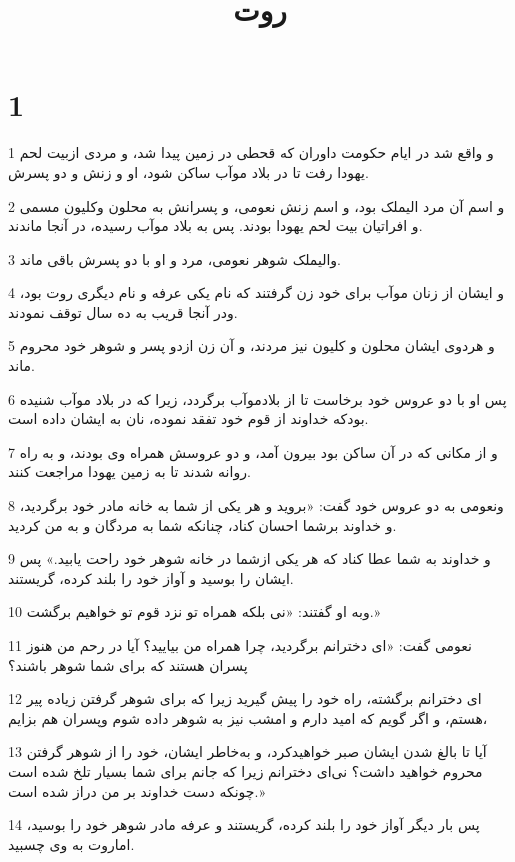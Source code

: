 

\title{روت}

 
\chapter{1}

\par 1 و واقع شد در ایام حکومت داوران که قحطی در زمین پیدا شد، و مردی ازبیت لحم یهودا رفت تا در بلاد موآب ساکن شود، او و زنش و دو پسرش.
\par 2 و اسم آن مرد الیملک بود، و اسم زنش نعومی، و پسرانش به محلون وکلیون مسمی و افراتیان بیت لحم یهودا بودند. پس به بلاد موآب رسیده، در آنجا ماندند.
\par 3 والیملک شوهر نعومی، مرد و او با دو پسرش باقی ماند.
\par 4 و ایشان از زنان موآب برای خود زن گرفتند که نام یکی عرفه و نام دیگری روت بود، ودر آنجا قریب به ده سال توقف نمودند.
\par 5 و هردوی ایشان محلون و کلیون نیز مردند، و آن زن ازدو پسر و شوهر خود محروم ماند.
\par 6 پس او با دو عروس خود برخاست تا از بلادموآب برگردد، زیرا که در بلاد موآب شنیده بودکه خداوند از قوم خود تفقد نموده، نان به ایشان داده است.
\par 7 و از مکانی که در آن ساکن بود بیرون آمد، و دو عروسش همراه وی بودند، و به راه روانه شدند تا به زمین یهودا مراجعت کنند.
\par 8 ونعومی به دو عروس خود گفت: «بروید و هر یکی از شما به خانه مادر خود برگردید، و خداوند برشما احسان کناد، چنانکه شما به مردگان و به من کردید.
\par 9 و خداوند به شما عطا کناد که هر یکی ازشما در خانه شوهر خود راحت یابید.» پس ایشان را بوسید و آواز خود را بلند کرده، گریستند.
\par 10 وبه او گفتند: «نی بلکه همراه تو نزد قوم تو خواهیم برگشت.»
\par 11 نعومی گفت: «ای دخترانم برگردید، چرا همراه من بیایید؟ آیا در رحم من هنوز پسران هستند که برای شما شوهر باشند؟
\par 12 ‌ای دخترانم برگشته، راه خود را پیش گیرید زیرا که برای شوهر گرفتن زیاده پیر هستم، و اگر گویم که امید دارم و امشب نیز به شوهر داده شوم وپسران هم بزایم،
\par 13 آیا تا بالغ شدن ایشان صبر خواهیدکرد، و به‌خاطر ایشان، خود را از شوهر گرفتن محروم خواهید داشت؟ نی‌ای دخترانم زیرا که جانم برای شما بسیار تلخ شده است چونکه دست خداوند بر من دراز شده است.»
\par 14 پس بار دیگر آواز خود را بلند کرده، گریستند و عرفه مادر شوهر خود را بوسید، اماروت به وی چسبید.
